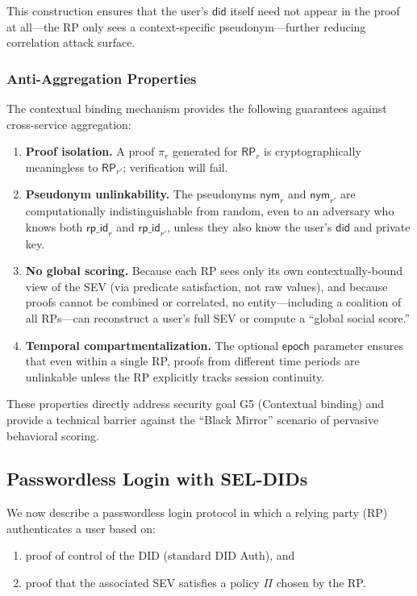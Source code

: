 \documentclass[11pt]{article}
\begin{document}
This construction ensures that the user's $\mathsf{did}$ itself need not appear in the proof at all---the RP only sees a context-specific pseudonym---further reducing correlation attack surface.

\subsubsection{Anti-Aggregation Properties}

The contextual binding mechanism provides the following guarantees against cross-service aggregation:

\begin{enumerate}
  \item \textbf{Proof isolation.} A proof $\pi_r$ generated for $\textsf{RP}_r$ is cryptographically meaningless to $\textsf{RP}_{r'}$; verification will fail.
  \item \textbf{Pseudonym unlinkability.} The pseudonyms $\mathsf{nym}_r$ and $\mathsf{nym}_{r'}$ are computationally indistinguishable from random, even to an adversary who knows both $\mathsf{rp\_id}_r$ and $\mathsf{rp\_id}_{r'}$, unless they also know the user's $\mathsf{did}$ and private key.
  \item \textbf{No global scoring.} Because each RP sees only its own contextually-bound view of the SEV (via predicate satisfaction, not raw values), and because proofs cannot be combined or correlated, no entity---including a coalition of all RPs---can reconstruct a user's full SEV or compute a ``global social score.''
  \item \textbf{Temporal compartmentalization.} The optional $\mathsf{epoch}$ parameter ensures that even within a single RP, proofs from different time periods are unlinkable unless the RP explicitly tracks session continuity.
\end{enumerate}

These properties directly address security goal G5 (Contextual binding) and provide a technical barrier against the ``Black Mirror'' scenario of pervasive behavioral scoring.

\subsection{Passwordless Login with SEL-DIDs}

We now describe a passwordless login protocol in which a relying party (RP) authenticates a user based on:

\begin{enumerate}
  \item proof of control of the DID (standard DID Auth), and
  \item proof that the associated SEV satisfies a policy $\Pi$ chosen by the RP.
\end{enumerate}
\end{document}
